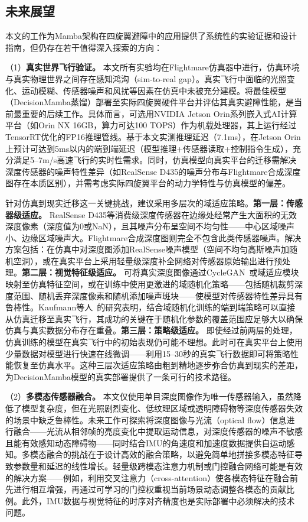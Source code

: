 \documentclass[12pt,a4paper]{article}
\numberwithin{equation}{section}
\numberwithin{figure}{section}
\numberwithin{table}{section}
\begin{document}
\subsection{未来展望}

本文的工作为Mamba架构在四旋翼避障中的应用提供了系统性的实验证据和设计指南，但仍存在若干值得深入探索的方向：

（1）\textbf{真实世界飞行验证。} 本文所有实验均在Flightmare仿真器\cite{shah2017flightmare}中进行，仿真环境与真实物理世界之间存在感知鸿沟（sim-to-real gap）。真实飞行中面临的光照变化、运动模糊、传感器噪声和风扰等因素在仿真中未被充分建模。将最佳模型（DecisionMamba蒸馏）部署至实际四旋翼硬件平台并评估其真实避障性能，是当前最重要的后续工作。具体而言，可选用NVIDIA Jetson Orin系列嵌入式AI计算平台（如Orin NX 16GB，算力可达100 TOPS）作为机载处理器，其上运行经过TensorRT优化的FP16推理管线。基于本文实测推理延迟（7.1ms），在Jetson Orin上预计可达到5ms以内的端到端延迟（模型推理+传感器读取+控制指令生成），充分满足5--7m/s高速飞行的实时性需求。同时，仿真模型向真实平台的迁移需解决深度传感器的噪声特性差异（如RealSense D435的噪声分布与Flightmare合成深度图存在本质区别），并需考虑实际四旋翼平台的动力学特性与仿真模型的偏差。

针对仿真到现实迁移这一关键挑战，建议采用多层次的域适应策略。\textbf{第一层：传感器级适应。} RealSense D435等消费级深度传感器在边缘处经常产生大面积的无效深度像素（深度值为0或NaN），且其噪声分布呈空间不均匀性——中心区域噪声小、边缘区域噪声大。Flightmare合成深度图则完全不包含此类传感器噪声。解决方案包括：在仿真中对深度图添加RealSense噪声模型（空间不均匀高斯噪声加随机空洞），或在真实平台上采用轻量级深度补全网络对传感器原始输出进行预处理。\textbf{第二层：视觉特征级适应。} 可将真实深度图像通过CycleGAN~\cite{zhu2017cyclegan}或域适应模块映射至仿真特征空间，或在训练中使用更激进的域随机化策略——包括随机裁剪深度范围、随机丢弃深度像素和随机添加噪声斑块——使模型对传感器特性差异具有鲁棒性。Kaufmann等人~\cite{kaufmann2023champion}的研究表明，结合域随机化训练的端到端策略可以直接从仿真迁移至真实飞行，其成功的关键在于随机化参数的覆盖范围应足够大以确保仿真与真实数据分布存在重叠。\textbf{第三层：策略级适应。} 即使经过前两层的处理，仿真训练的模型在真实飞行中的初始表现仍可能不理想。此时可在真实平台上使用少量数据对模型进行快速在线微调——利用15--30秒的真实飞行数据即可将策略性能恢复至仿真水平。这种三层次适应策略由粗到精地逐步弥合仿真到现实的差距，为DecisionMamba模型的真实部署提供了一条可行的技术路径。

（2）\textbf{多模态传感器融合。} 本文仅使用单目深度图像作为唯一传感器输入，虽然降低了模型复杂度，但在光照剧烈变化、低纹理区域或透明障碍物等深度传感器失效的场景中缺乏鲁棒性。未来工作可探索将深度图像与光流（optical flow）信息进行融合——光流从相邻帧的亮度变化中提取运动信息，对深度传感器的噪声不敏感且能有效感知动态障碍物——同时结合IMU的角速度和加速度数据提供自运动感知。多模态融合的挑战在于设计高效的融合策略，以避免简单地拼接多模态特征导致参数量和延迟的线性增长。轻量级跨模态注意力机制或门控融合网络可能是有效的解决方案——例如，利用交叉注意力（cross-attention）使各模态特征在融合前先进行相互增强，再通过可学习的门控权重视当前场景动态调整各模态的贡献比例。此外，IMU数据与视觉特征的时序对齐精度也是实际部署中必须解决的技术问题。
\end{document}
